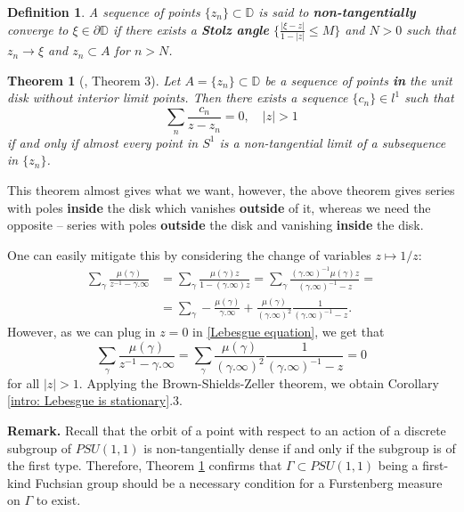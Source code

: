 \documentclass[11pt]{article}
\newtheorem{definition}{Definition}[section]
\newtheorem{theorem}{Theorem}[section]
\begin{document}
\begin{definition}
	\label{D:non-tangential convergence}
	A sequence of points $\{z_n\} \subset \mathbb{D}$ is said to \textbf{non-tangentially} converge to $\xi \in \partial \mathbb{D}$ if there exists a \textbf{Stolz angle} $\{ \frac{|\xi - z|}{1 - |z|} \le M \}$ and $N > 0$ such that $z_n \rightarrow \xi$ and $z_n \subset A$ for $n > N$.
\end{definition}

\begin{theorem}[\cite{brownsums}, Theorem 3]
	\label{non-tangential equiv rep}
	Let $A = \{ z_n \} \subset \mathbb{D}$ be a sequence of points \textbf{in} the unit disk without interior limit points. Then there exists a sequence $\{c_n\} \in l^1$ such that
	\[
	\sum_n \frac{c_n}{z - z_n} = 0, \quad |z| > 1
	\]
	if and only if almost every point in $S^1$ is a non-tangential limit of a subsequence in $\{z_n\}$.
\end{theorem}

This theorem almost gives what we want, however, the above theorem gives series with poles \textbf{inside} the disk which vanishes \textbf{outside} of it, whereas we need the opposite -- series with poles \textbf{outside} the disk and vanishing \textbf{inside} the disk.

One can easily mitigate this by considering the change of variables $z \mapsto 1/z$:
\[
\begin{aligned}
	\sum_{\gamma} \frac{\mu(\gamma)}{z^{-1} - \gamma.\infty} &= \sum_{\gamma} \frac{\mu(\gamma) z}{1 - (\gamma.\infty) z} = \sum_{\gamma} \frac{(\gamma.\infty)^{-1}  \mu(\gamma) z}{(\gamma.\infty)^{-1} -  z} = \\ 
	&= \sum_{\gamma} - \frac{\mu(\gamma)}{\gamma.\infty} + \frac{\mu(\gamma)}{(\gamma.\infty)^2} \frac{1}{(\gamma.\infty)^{-1} - z}.
\end{aligned}
\]
However, as we can plug in $z = 0$ in \eqref{Lebesgue equation}, we get that
\[
\sum_{\gamma} \frac{\mu(\gamma)}{z^{-1} - \gamma.\infty} = \sum_{\gamma}\frac{\mu(\gamma)}{(\gamma.\infty)^2} \frac{1}{(\gamma.\infty)^{-1} - z} = 0
\]
for all $|z| > 1$. Applying the Brown-Shields-Zeller theorem, we obtain Corollary \ref{intro: Lebesgue is stationary}.3.

\textbf{Remark.} Recall that the orbit of a point with respect to an action of a discrete subgroup of $PSU(1,1)$ is non-tangentially dense if and only if the subgroup is of the first type. Therefore, Theorem \ref{non-tangential equiv rep} confirms that $\Gamma \subset PSU(1,1)$ being a first-kind Fuchsian group should be a necessary condition for a Furstenberg measure on $\Gamma$ to exist.
\end{document}
